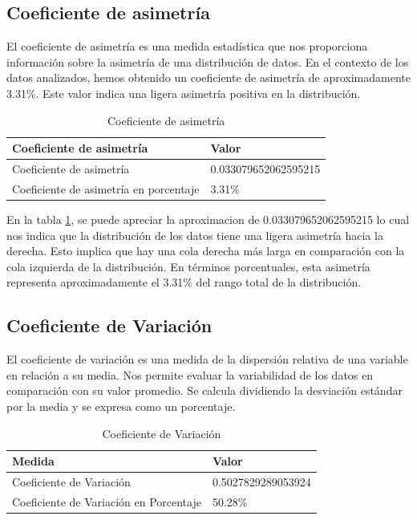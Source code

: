 \subsection{Coeficiente de asimetría}

El coeficiente de asimetría es una medida estadística que nos proporciona información sobre la asimetría de una distribución de datos. En el contexto de los datos analizados, hemos obtenido un coeficiente de asimetría de aproximadamente 3.31\%. Este valor indica una ligera asimetría positiva en la distribución.

\begin{table}[H]
    \centering
    \caption{Coeficiente de asimetría}
    \begin{tabular}{ll}
        \hline
        \textbf{Coeficiente de asimetría}      & \textbf{Valor}       \\
        \hline
        Coeficiente de asimetría               & 0.033079652062595215 \\
        Coeficiente de asimetría en porcentaje & 3.31\%               \\
        \hline
    \end{tabular}%
    \label{tab:skewness}%
\end{table}%

En la tabla \ref{tab:skewness}, se puede apreciar la aproximacion de 0.033079652062595215 lo cual nos indica que la distribución de los datos tiene una ligera asimetría hacia la derecha. Esto implica que hay una cola derecha más larga en comparación con la cola izquierda de la distribución. En términos porcentuales, esta asimetría representa aproximadamente el 3.31\% del rango total de la distribución.

\subsection{Coeficiente de Variación}

El coeficiente de variación es una medida de la dispersión relativa de una variable en relación a su media. Nos permite evaluar la variabilidad de los datos en comparación con su valor promedio. Se calcula dividiendo la desviación estándar por la media y se expresa como un porcentaje.

\begin{table}[H]
    \centering
    \caption{Coeficiente de Variación}
    \begin{tabular}{ll}
        \hline
        \textbf{Medida}                        & \textbf{Valor}     \\
        \hline
        Coeficiente de Variación               & 0.5027829289053924 \\
        \hline
        Coeficiente de Variación en Porcentaje & 50.28\%            \\
        \hline
    \end{tabular}%
    \label{tab:coef_variacion}%
\end{table}%

